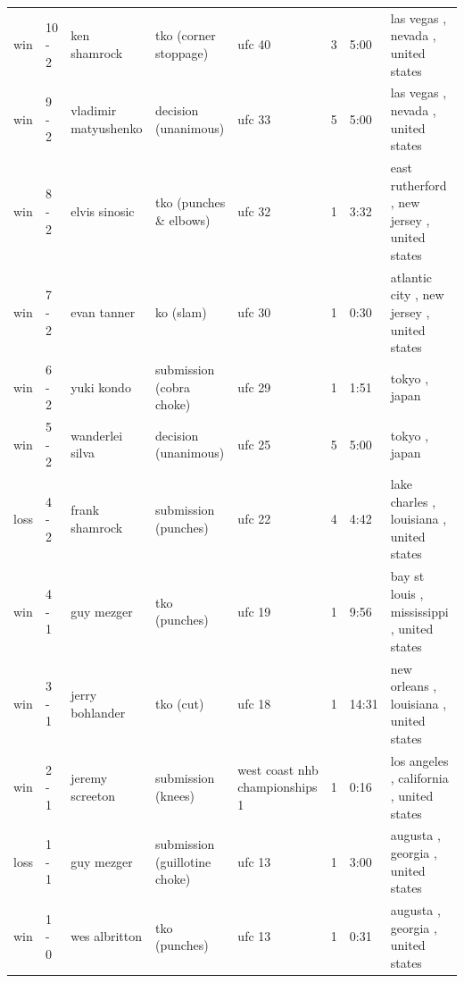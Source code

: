 \documentclass{article}
\begin{document}
\begin{tabular}{llllllll}
win & 10 - 2 & ken shamrock & tko (corner stoppage) & ufc 40 & 3 & 5:00 & las vegas , nevada , united states \\
win & 9 - 2 & vladimir matyushenko & decision (unanimous) & ufc 33 & 5 & 5:00 & las vegas , nevada , united states \\
win & 8 - 2 & elvis sinosic & tko (punches \& elbows) & ufc 32 & 1 & 3:32 & east rutherford , new jersey , united states \\
win & 7 - 2 & evan tanner & ko (slam) & ufc 30 & 1 & 0:30 & atlantic city , new jersey , united states \\
win & 6 - 2 & yuki kondo & submission (cobra choke) & ufc 29 & 1 & 1:51 & tokyo , japan \\
win & 5 - 2 & wanderlei silva & decision (unanimous) & ufc 25 & 5 & 5:00 & tokyo , japan \\
loss & 4 - 2 & frank shamrock & submission (punches) & ufc 22 & 4 & 4:42 & lake charles , louisiana , united states \\
win & 4 - 1 & guy mezger & tko (punches) & ufc 19 & 1 & 9:56 & bay st louis , mississippi , united states \\
win & 3 - 1 & jerry bohlander & tko (cut) & ufc 18 & 1 & 14:31 & new orleans , louisiana , united states \\
win & 2 - 1 & jeremy screeton & submission (knees) & west coast nhb championships 1 & 1 & 0:16 & los angeles , california , united states \\
loss & 1 - 1 & guy mezger & submission (guillotine choke) & ufc 13 & 1 & 3:00 & augusta , georgia , united states \\
win & 1 - 0 & wes albritton & tko (punches) & ufc 13 & 1 & 0:31 & augusta , georgia , united states \\
\bottomrule
\end{tabular}
\end{document}
